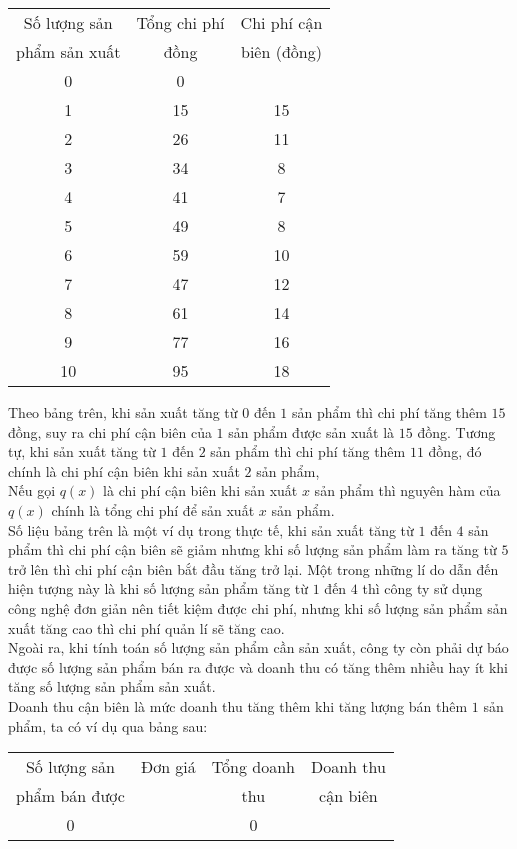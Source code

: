 \begin{vd}
{		\begin{longtable}{|c|c|c|}
			\hline
			Số lượng sản&Tổng chi phí&Chi phí cận\\
			phẩm sản xuất&đồng&biên (đồng)\\ \hline 
			0&0&\\ \hline
			1&15&15\\ \hline
			2&26&11\\ \hline
			3&34&8\\ \hline
			4&41&7\\ \hline
			5&49&8\\ \hline
			6&59&10\\ \hline
			7&47&12\\ \hline
			8&61&14\\ \hline
			9&77&16\\ \hline
			10&95&18\\ \hline
		\end{longtable}
		\noindent Theo bảng trên, khi sản xuất tăng từ $0$ đến $1$ sản phẩm thì chi phí tăng thêm $15$ đồng, suy ra chi phí cận biên của $1$ sản phẩm được sản xuất là $15$ đồng. Tương tự, khi sản xuất tăng từ $1$ đến $2$ sản phẩm thì chi phí tăng thêm $11$ đồng, đó chính là chi phí cận biên khi sản xuất $2$ sản phẩm,\\
		Nếu gọi $ q(x)$ là chi phí cận biên khi sản xuất $x$ sản phẩm thì nguyên hàm của $ q(x)$ chính là tổng chi phí để sản xuất $x$ sản phẩm.\\
		Số liệu bảng trên là một ví dụ trong thực tế, khi sản xuất tăng từ $1$ đến $4$ sản phẩm thì chi phí cận biên sẽ giảm nhưng khi số lượng sản phẩm làm ra tăng từ $5$ trở lên thì chi phí cận biên bắt đầu tăng trở lại. Một trong những lí do dẫn đến hiện tượng này là khi số lượng sản phẩm tăng từ $1$ đến $4$ thì công ty sử dụng công nghệ đơn giản nên tiết kiệm được chi phí, nhưng khi số lượng sản phẩm sản xuất tăng cao thì chi phí quản lí sẽ tăng cao.\\
		Ngoài ra, khi tính toán số lượng sản phẩm cần sản xuất, công ty còn phải dự báo được số lượng sản phẩm bán ra được và doanh thu có tăng thêm nhiều hay ít khi tăng số lượng sản phẩm sản xuất.\\
		Doanh thu cận biên là mức doanh thu tăng thêm khi tăng lượng bán thêm $1$ sản phẩm, ta có ví dụ qua bảng sau: 
		\begin{longtable}{|c|c|c|c|}
			\hline
			Số lượng sản&Đơn giá&Tổng doanh&Doanh thu\\
			phẩm bán được &&thu&cận biên\\ \hline
			0&&0&\\ \hline

\end{longtable}}
\end{vd}
